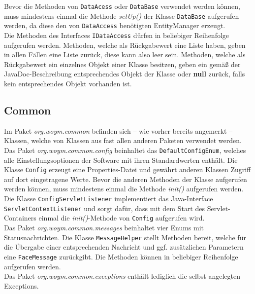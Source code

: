 \documentclass[fontsize=12pt,paper=a4,twoside]{scrartcl}
\begin{document}
Bevor die Methoden von \texttt{DataAcess} oder \texttt{DataBase} verwendet werden können, muss mindestens einmal die Methode \textit{setUp()} der Klasse \texttt{DataBase} aufgerufen werden, da diese den von \texttt{DataAccess} benötigten EntityManager erzeugt.\\
Die Methoden des Interfaces \texttt{IDataAccess} dürfen in beliebiger Reihenfolge aufgerufen werden. Methoden, welche als Rückgabewert eine Liste haben, geben in allen Fällen eine Liste zurück, diese kann also leer sein. Methoden, welche als Rückgabewert ein einzelnes Objekt einer Klasse besitzen, geben ein gemäß der JavaDoc-Beschreibung entsprechendes Objekt der Klasse oder \textbf{null} zurück, falls kein entsprechendes Objekt vorhanden ist. 





\subsection{Common}
\label{subsec:Common}
Im Paket \textit{org.woym.common} befinden sich -- wie vorher bereits angemerkt -- Klassen, welche von Klassen aus fast allen anderen Paketen verwendet werden.\\
Das Paket \textit{org.woym.common.config} beinhaltet das \texttt{DefaultConfigEnum}, welches alle Einstellungsoptionen der Software mit ihren Standardwerten enthält. Die Klasse \texttt{Config} erzeugt eine Properties-Datei und gewährt anderen Klassen Zugriff auf dort eingetragene Werte. Bevor die anderen Methoden der Klasse aufgerufen werden können, muss mindestens einmal die Methode \textit{init()} aufgerufen werden. 
\\
Die Klasse \texttt{ConfigServletListener} implementiert das Java-Interface \texttt{ServletContextListener} und sorgt dafür, dass mit dem Start des Servlet-Containers einmal die \textit{init()}-Methode von \texttt{Config} aufgerufen wird.\\

Das Paket \textit{org.woym.common.messages} beinhaltet vier Enums mit Statusnachrichten. Die Klasse \texttt{MessageHelper} stellt Methoden bereit, welche für die Übergabe einer entsprechenden Nachricht und ggf. zusätzlichen Parametern eine \texttt{FaceMessage} zurückgibt. Die Methoden können in beliebiger Reihenfolge aufgerufen werden.\\

Das Paket \textit{org.woym.common.exceptions} enthält lediglich die selbst angelegten Exceptions. \\
\end{document}
